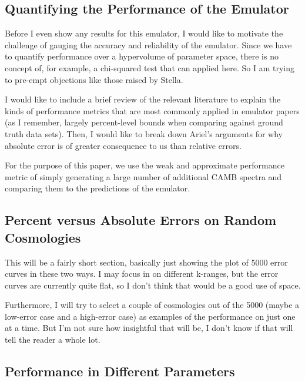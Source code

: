 \documentclass[11pt]{article}
\begin{document}
\begin{centering}
\subsection{Quantifying the Performance of the Emulator}
\end{centering}

Before I even show any results for this emulator, I would like to motivate the challenge of gauging the accuracy and reliability of the emulator. Since we have to quantify performance over a hypervolume of parameter space, there is no concept of, for example, a chi-squared test that can applied here. So I am trying to pre-empt objections like those raised by Stella.

I would like to include a brief review of the relevant literature to explain the kinds of performance metrics that are most commonly applied in emulator papers (as I remember, largely percent-level bounds when comparing against ground truth data sets). Then, I would like to break down Ariel's arguments for why absolute error is of greater consequence to us than relative errors.

For the purpose of this paper, we use the weak and approximate performance metric of simply generating a large number of additional CAMB spectra and comparing them to the predictions of the emulator.

\begin{centering}
\subsection{Percent versus Absolute Errors on Random Cosmologies}
\end{centering}

This will be a fairly short section, basically just showing the plot of 5000 error curves in these two ways. I may focus in on different k-ranges, but the error curves are currently quite flat, so I don't think that would be a good use of space.

Furthermore, I will try to select a couple of cosmologies out of the 5000 (maybe a low-error case and a high-error case) as examples of the performance on just one at a time. But I'm not sure how insightful that will be, I don't know if that will tell the reader a whole lot.

\begin{centering}
\subsection{Performance in Different Parameters}
\end{centering}
\end{document}
